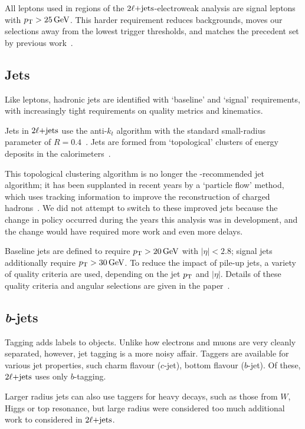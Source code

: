 All leptons used in regions of the $\twoljets$-electroweak analysis are signal
leptons with $\pt > 25\,\eV[G]$.
This harder requirement reduces backgrounds, moves our selections away from the
lowest trigger thresholds, and matches the precedent set by previous
work~\cite{atlas_23l_SUSY_2016_24}.


\subsection{Jets}
Like leptons, hadronic jets are identified with `baseline' and `signal'
requirements, with increasingly tight requirements on quality metrics and
kinematics.

Jets in $\twoljets$ use the anti-$k_t$ algorithm with the standard small-radius
parameter of $R=0.4$~\cite{jet_anti_kt}.
Jets are formed from `topological' clusters of energy deposits in the
calorimeters~\cite{atlas_jet_topo_PERF_2014_07}.

This topological clustering algorithm is no longer the \atlas-recommended jet
algorithm; it has been supplanted in recent years by a `particle flow' method,
which uses tracking information to improve the reconstruction of charged
hadrons~\cite{atlas_jet_pflow_PERF_2015_09}.
We did not attempt to switch to these improved jets because the change in
policy occurred during the years this analysis was in development, and the
change would have required more work and even more delays.

Baseline jets are defined to require $\pt > 20\,\eV[G]$ with $|\eta| < 2.8$;
signal jets additionally require $\pt > 30\,\eV[G]$.
To reduce the impact of pile-up jets, a variety of quality criteria are used,
depending on the jet $\pt$ and $|\eta|$.
Details of these quality criteria and angular selections are given in the
paper~\cite{atlas2022searches}.


\subsection{\textit{b}-jets}
\label{sec:2ljets_btagging}
Tagging adds labels to objects.
Unlike how electrons and muons are very cleanly separated, however, jet tagging
is a more noisy affair.
Taggers are available for various jet properties, such charm flavour ($c$-jet),
bottom flavour ($b$-jet).
Of these, $\twoljets$ uses only $b$-tagging.

Larger radius jets can also use taggers for heavy decays, such as those from
$W$, Higgs or top resonance, but large radius were considered too much
additional work to considered in $\twoljets$.

